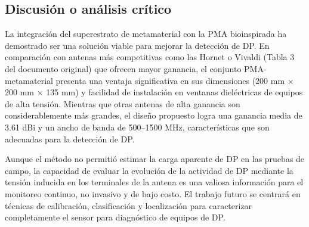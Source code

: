 \subsection*{Discusión o análisis crítico}
La integración del superestrato de metamaterial con la PMA bioinspirada ha demostrado ser una solución viable para mejorar la detección de DP. En comparación con antenas más competitivas como las Hornet o Vivaldi (Tabla 3 del documento original) que ofrecen mayor ganancia, el conjunto PMA-metamaterial presenta una ventaja significativa en sus dimensiones (200 mm $\times$ 200 mm $\times$ 135 mm) y facilidad de instalación en ventanas dieléctricas de equipos de alta tensión. Mientras que otras antenas de alta ganancia son considerablemente más grandes, el diseño propuesto logra una ganancia media de 3.61 dBi y un ancho de banda de 500--1500 MHz, características que son adecuadas para la detección de DP.

Aunque el método no permitió estimar la carga aparente de DP en las pruebas de campo, la capacidad de evaluar la evolución de la actividad de DP mediante la tensión inducida en los terminales de la antena es una valiosa información para el monitoreo continuo, no invasivo y de bajo costo. El trabajo futuro se centrará en técnicas de calibración, clasificación y localización para caracterizar completamente el sensor para diagnóstico de equipos de DP.


